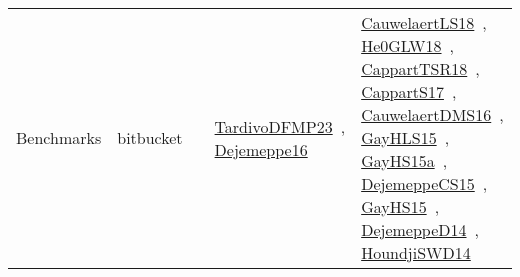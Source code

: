 {\begin{longtable}{lp{3cm}>{\raggedright\arraybackslash}p{6cm}>{\raggedright\arraybackslash}p{6cm}>{\raggedright\arraybackslash}p{8cm}}
Benchmarks & bitbucket &  & \href{works/TardivoDFMP23.pdf}{TardivoDFMP23}~\cite{TardivoDFMP23}, \href{works/Dejemeppe16.pdf}{Dejemeppe16}~\cite{Dejemeppe16} & \href{works/CauwelaertLS18.pdf}{CauwelaertLS18}~\cite{CauwelaertLS18}, \href{works/He0GLW18.pdf}{He0GLW18}~\cite{He0GLW18}, \href{works/CappartTSR18.pdf}{CappartTSR18}~\cite{CappartTSR18}, \href{works/CappartS17.pdf}{CappartS17}~\cite{CappartS17}, \href{works/CauwelaertDMS16.pdf}{CauwelaertDMS16}~\cite{CauwelaertDMS16}, \href{works/GayHLS15.pdf}{GayHLS15}~\cite{GayHLS15}, \href{works/GayHS15a.pdf}{GayHS15a}~\cite{GayHS15a}, \href{works/DejemeppeCS15.pdf}{DejemeppeCS15}~\cite{DejemeppeCS15}, \href{works/GayHS15.pdf}{GayHS15}~\cite{GayHS15}, \href{works/DejemeppeD14.pdf}{DejemeppeD14}~\cite{DejemeppeD14}, \href{works/HoundjiSWD14.pdf}{HoundjiSWD14}~\cite{HoundjiSWD14}\\

\end{longtable}}
